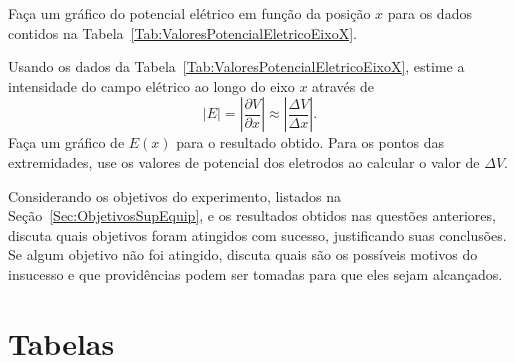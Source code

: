\begin{question}[type={exam}]
Faça um gráfico do potencial elétrico em função da posição $x$ para os dados contidos na Tabela~\ref{Tab:ValoresPotencialEletricoEixoX}.
\end{question}

\begin{question}[type={exam}]
Usando os dados da Tabela~\ref{Tab:ValoresPotencialEletricoEixoX}, estime a intensidade do campo elétrico ao longo do eixo $x$ através de
\begin{equation}
    |E| = \left|\frac{\partial V}{\partial x}\right| \approx \left|\frac{\Delta V}{\Delta x}\right|.
\end{equation}
%
Faça um gráfico de $E(x)$ para o resultado obtido. Para os pontos das extremidades, use os valores de potencial dos eletrodos ao calcular o valor de $\Delta V$.
\end{question}

\begin{question}[type={exam}]
Considerando os objetivos do experimento, listados na Seção~\ref{Sec:ObjetivosSupEquip}, e os resultados obtidos nas questões anteriores, discuta quais objetivos foram atingidos com sucesso, justificando suas conclusões. Se algum objetivo não foi atingido, discuta quais são os possíveis motivos do insucesso e que providências podem ser tomadas para que eles sejam alcançados.
\end{question}

\vfill
\pagebreak
\section{Tabelas}


